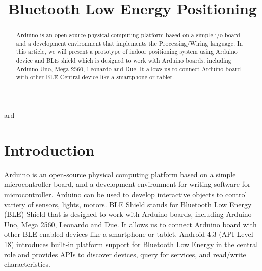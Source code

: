\documentclass[conference,a4paper]{../../sty/IEEEtran}
\begin{document}
%
\title{Bluetooth Low Energy Positioning}


\author{
}


\maketitle


\begin{abstract}

Arduino is an open-source physical computing platform based on a simple i/o board and a development environment that implements the Processing/Wiring language. In this article, we will present a prototype of indoor positioning system using Arduino device and BLE shield which is designed to work with Arduino boards, including Arduino Uno, Mega 2560, Leonardo and Due. It allows us to connect Arduino board with other BLE Central device like a smartphone or tablet. 

\end{abstract}




ard\section{Introduction}
Arduino is an open-source physical computing platform based on a simple microcontroller board, and a development environment for writing software for microcontroller. Arduino can be used to develop interactive objects to control variety of sensors, lights, motors. BLE Shield stands for Bluetooth Low Energy (BLE) Shield \cite{ble} that is designed to work with Arduino boards, including Arduino Uno, Mega 2560, Leonardo and Due. It allows us to connect Arduino board with other BLE enabled devices like a smartphone or tablet. Android 4.3 (API Level 18) introduces built-in platform support for Bluetooth Low Energy in the central role and provides APIs to discover devices, query for services, and read/write characteristics.
\end{document}
